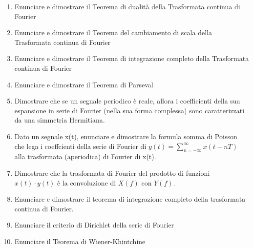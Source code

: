 \documentclass[
]{article}
\begin{document}
\begin{enumerate}
\def\labelenumi{\arabic{enumi}.}
\item
  Enunciare e dimostrare il Teorema di dualità della Trasformata
  continua di Fourier
\item
  Enunciare e dimostrare il Teorema del cambiamento di scala della
  Trasformata continua di Fourier
\item
  Enunciare e dimostrare il Teorema di integrazione completo della
  Trasformata continua di Fourier
\item
  Enunciare e dimostrare il Teorema di Parseval
\item
  Dimostrare che se un segnale periodico è reale, allora i coefficienti
  della sua espansione in serie di Fourier (nella sua forma complessa)
  sono caratterizzati da una simmetria Hermitiana.
\item
  Dato un segnale x(t), enunciare e dimostrare la formula somma di
  Poisson che lega i coeffcienti della serie di Fourier di \(\displaystyle y(t) = \sum_{n = -\infty}^{\infty} x(t - nT)\)
  alla trasformata (aperiodica) di Fourier di x(t).
\item
  Dimostrare che la trasformata di Fourier del prodotto di funzioni
  \(x(t) \cdot y(t)\) è la convoluzione di \(X(f)\) con \(Y (f)\).
\item
  Enunciare e dimostrare il teorema di integrazione completo della
  trasformata continua di Fourier.
\item
  Enunciare il criterio di Dirichlet della serie di Fourier
\item
  Enunciare il Teorema di Wiener-Khintchine
\end{enumerate}
\end{document}
